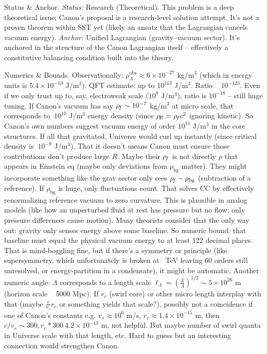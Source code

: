 \documentclass[11pt]{article}
\begin{document}
Status & Anchor. \textit{Status:} Research (Theoretical). This problem is a deep theoretical issue; Canon’s proposal is a research-level solution attempt. It’s not a proven theorem within SST yet (likely an ansatz that the Lagrangian cancels vacuum energy). \textit{Anchor:} Unified Lagrangian (gravity–vacuum sector). It’s anchored in the structure of the Canon Lagrangian itself – effectively a constitutive balancing condition built into the theory.


Numerics & Bounds. Observationally: $\rho_{\Lambda}^{\text{obs}} \approx 6\times10^{-27}$ kg/m$^3$ (which in energy units is $5.4\times10^{-10}$ J/m$^3$). QFT estimate: up to $10^{113}$ J/m$^3$. Ratio ~ $10^{-123}$. Even if we only trust up to, say, electroweak scale ($10^8$ J/m$^3$), ratio is $10^{-18}$ – still huge tuning. If Canon’s vacuum has say $\rho_{\!f} \sim 10^{-7}$ kg/m$^3$ at micro scale, that corresponds to $~10^{10}$ J/m$^3$ energy density (since $\rho_{\!E} = \rho_{\!f} c^2$ ignoring kinetic). So Canon’s own numbers suggest vacuum energy of order $10^{11}$ J/m$^3$ in the core structures. If all that gravitated, Universe would curl up instantly (since critical density is $~10^{-9}$ J/m$^3$). That it doesn’t means Canon must ensure those contributions don’t produce large $R$. Maybe their $\rho_{\!f}$ is not directly $\rho$ that appears in Einstein eq (maybe only deviations from $\rho_{\text{bg}}$ matter). They might incorporate something like the grav sector only sees $\rho_{\!f} - \rho_{\text{bg}}$ (subtraction of a reference). If $\rho_{\text{bg}}$ is huge, only fluctuations count. That solves CC by effectively renormalizing reference vacuum to zero curvature. This is plausible in analog models (like how an unperturbed fluid at rest has pressure but no flow; only pressure differences cause motion). Many theorists consider that the only way out: gravity only senses energy above some baseline. So numeric bound: that baseline must equal the physical vacuum energy to at least 122 decimal places. That is mind-boggling fine, but if there’s a symmetry or principle (like supersymmetry, which unfortunately is broken at ~TeV leaving 60 orders still unresolved, or energy-partition in a condensate), it might be automatic. Another numeric angle: $\Lambda$ corresponds to a length scale $\ell_\Lambda = (\frac{3}{\Lambda})^{1/2} \sim 5\times10^{26}$ m (horizon scale ~ 5000 Mpc). If $r_c$ (swirl core) or other micro length interplay with that (maybe $\frac{c}{v_s} r_c$ or something yields that scale?), possibly not a coincidence if one of Canon’s constants e.g. $v_s \approx 10^6$ m/s, $r_c \approx 1.4\times10^{-15}$ m, then $c/v_s \sim 300, r_c * 300 ~4.2\times10^{-13}$ m, not helpful. But maybe number of swirl quanta in Universe scale with that length, etc. Hard to guess but an interesting connection would strengthen Canon.
\end{document}
